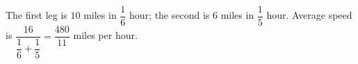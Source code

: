 The first leg is $10$ miles in $\dfrac{1}{6}$ hour; the second is $6$ miles in $\dfrac{1}{5}$ hour. Average speed is $\dfrac{16}{\dfrac{1}{6}+\dfrac{1}{5}}=\boxed{\dfrac{480}{11}}$ miles per hour.
